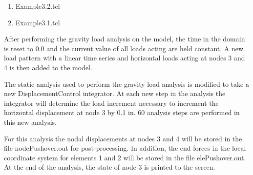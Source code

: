 \documentclass[12pt]{article}
\begin{document}
\vspace{0.2in}  
\begin{enumerate} 
\item Example3.2.tcl
\item Example3.1.tcl
\end{enumerate}

\vspace{0.2in} 

After performing the gravity load analysis on the model, the time in
the domain is reset to 0.0 and the current value of all loads acting
are held constant. A new load pattern with a linear time series and
horizontal loads acting at nodes 3 and 4 is then added to the model.

\vspace{0.2in}

The static analysis used to perform the gravity load analysis is
modified to take a new DisplacementControl integrator. At each new
step in the analysis the integrator will determine the load increment
necessary to increment the horizontal displacement at node 3 by 0.1 in.
60 analysis steps are performed in this new analysis.

\vspace{0.2in} 

For this analysis the nodal displacements at nodes 3 and 4 will be stored in
the file nodePushover.out for post-processing. In addition, the
end forces in the local coordinate system for elements 1 and 2 will be
stored in the file elePushover.out. At the end of the analysis, the
state of node 3 is printed to the screen. 
\end{document}
